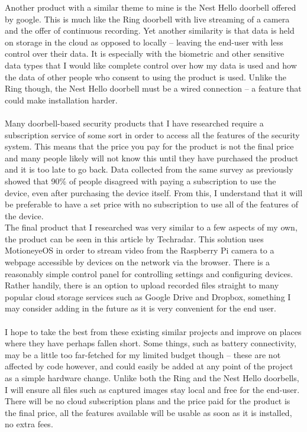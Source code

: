 \documentclass[9pt]{article}
\begin{document}
Another product with a similar theme to mine is the Nest Hello doorbell offered by google. This is much like the Ring doorbell with live streaming of a camera and the offer of continuous recording. Yet another similarity is that data is held on storage in the cloud as opposed to locally – leaving the end-user with less control over their data. It is especially with the biometric and other sensitive data types that I would like complete control over how my data is used and how the data of other people who consent to using the product is used. Unlike the Ring though, the Nest Hello doorbell must be a wired connection – a feature that could make installation harder.\\\\
Many doorbell-based security products that I have researched require a subscription service of some sort in order to access all the features of the security system. This means that the price you pay for the product is not the final price and many people likely will not know this until they have purchased the product and it is too late to go back. Data collected from the same survey as previously showed that 90\% of people disagreed with paying a subscription to use the device, even after purchasing the device itself. From this, I understand that it will be preferable to have a set price with no subscription to use all of the features of the device. \\
The final product that I researched was very similar to a few aspects of my own, the product can be seen in this\cite{techradarProduct} article by Techradar. This solution uses MotioneyeOS in order to stream video from the Raspberry Pi camera to a webpage accessible by devices on the network via the browser. There is a reasonably simple control panel for controlling settings and configuring devices. Rather handily, there is an option to upload recorded files straight to many popular cloud storage services such as Google Drive and Dropbox, something I may consider adding in the future as it is very convenient for the end user.\\\\
I hope to take the best from these existing similar projects and improve on places where they have perhaps fallen short. Some things, such as battery connectivity, may be a little too far-fetched for my limited budget though – these are not affected by code however, and could easily be added at any point of the project as a simple hardware change. Unlike both the Ring and the Nest Hello doorbells, I will ensure all files such as captured images stay local and free for the end-user. There will be no cloud subscription plans and the price paid for the product is the final price, all the features available will be usable as soon as it is installed, no extra fees. 
\end{document}
